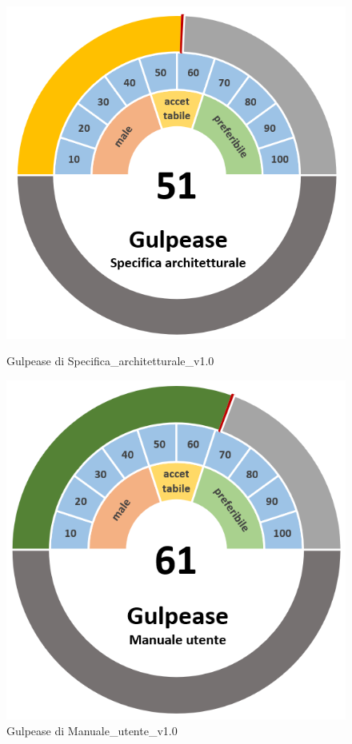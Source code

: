 \begin{figure}[H]
    \centering
    \begin{minipage}[b]{0.45\textwidth}
        \centering
        \includegraphics[width=\textwidth]{GulpeaseSa.png}
        \caption{Gulpease di Specifica\_architetturale\_v1.0}
    \end{minipage}
    \hfill
    \begin{minipage}[b]{0.45\textwidth}
        \centering
        \includegraphics[width=\textwidth]{GulpeaseMu.png}
        \caption{Gulpease di Manuale\_utente\_v1.0}
    \end{minipage}
\end{figure}
\newpage

